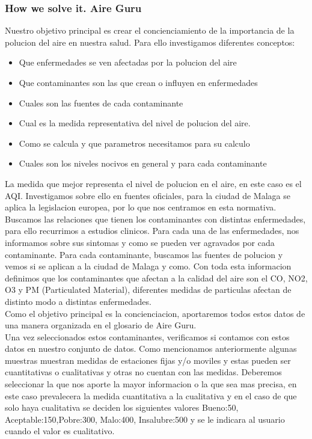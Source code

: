 \subsubsection{How we solve it. Aire Guru} 
Nuestro objetivo principal es crear el concienciamiento de la importancia de la polucion del aire en nuestra salud. Para ello investigamos diferentes conceptos:
\begin{itemize}
    \item Que enfermedades se ven afectadas por la polucion del aire
    \item Que contaminantes son las que crean o influyen en enfermedades
    \item Cuales son las fuentes de cada contaminante
    \item Cual es la medida representativa del nivel de polucion del aire.
    \item Como se calcula y que parametros necesitamos para su calculo
    \item Cuales son los niveles nocivos en general y para cada contaminante
\end{itemize}
La medida que mejor representa el nivel de polucion en el aire, en este caso es el AQI. Investigamos sobre ello en fuentes oficiales, para la ciudad de Malaga se aplica la 
legislacion europea, por lo que nos centramos en esta normativa.
Buscamos las relaciones que tienen los contaminantes con distintas enfermedades, para ello recurrimos a estudios clinicos. Para cada una de las enfermedades, nos informamos
sobre sus sintomas y como se pueden ver agravados por cada contaminante.
Para cada contaminante, buscamos las fuentes de polucion y vemos si se aplican a la ciudad de Malaga y como.
Con toda esta informacion definimos que los contaminantes que afectan a la calidad del aire son el CO, NO2, O3 y PM (Particulated Material), diferentes medidas de particulas
afectan de distinto modo a distintas enfermedades.\\

Como el objetivo principal es la concienciacion, aportaremos todos estos datos de una manera organizada en el glosario de Aire Guru.\\

Una vez seleccionados estos contaminantes, verificamos si contamos con estos datos en nuestro conjunto de datos. Como mencionamos anteriormente algunas muestras
muestran medidas de estaciones fijas y/o moviles y estas pueden ser cuantitativas o cualitativas y otras no cuentan con las medidas. Deberemos seleccionar la que
nos aporte la mayor informacion o la que sea mas precisa, en este caso prevalecera la medida cuantitativa a la cualitativa y en el caso de que solo haya cualitativa
se deciden los siguientes valores Bueno:50, Aceptable:150,Pobre:300, Malo:400, Insalubre:500 y se le indicara al usuario cuando el valor es cualitativo.\\


